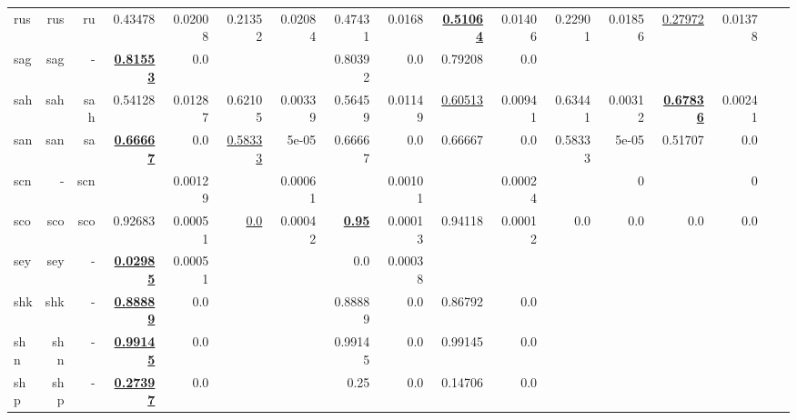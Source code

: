 \documentclass[11pt]{article}
\begin{document}
\begin{table*}[h]
{\begin{tabular}{lrrrrrrrrrrrrrrrr}
rus         & rus         & ru         & 0.43478         & 0.02008         & 0.21352         & 0.02084         & 0.47431         & 0.0168         & \textbf{\underline{0.51064}}         & 0.01406         & 0.22901         & 0.01856         & \underline{0.27972}         & 0.01378         \\
sag         & sag         & -         & \textbf{\underline{0.81553}}         & 0.0         &          &          & 0.80392         & 0.0         & 0.79208         & 0.0         &          &          &          &          \\
sah         & sah         & sah         & 0.54128         & 0.01287         & 0.62105         & 0.00339         & 0.56459         & 0.01149         & \underline{0.60513}         & 0.00941         & 0.63441         & 0.00312         & \textbf{\underline{0.67836}}         & 0.00241         \\
san         & san         & sa         & \textbf{\underline{0.66667}}         & 0.0         & \underline{0.58333}         & 5e-05         & 0.66667         & 0.0         & 0.66667         & 0.0         & 0.58333         & 5e-05         & 0.51707         & 0.0         \\
scn         & -         & scn         &          & 0.00129         &          & 0.00061         &          & 0.00101         &          & 0.00024         &          & 0         &          & 0         \\
sco         & sco         & sco         & 0.92683         & 0.00051         & \underline{0.0}         & 0.00042         & \textbf{\underline{0.95}}         & 0.00013         & 0.94118         & 0.00012         & 0.0         & 0.0         & 0.0         & 0.0         \\
sey         & sey         & -         & \textbf{\underline{0.02985}}         & 0.00051         &          &          & 0.0         & 0.00038         &          &          &          &          &          &          \\
shk         & shk         & -         & \textbf{\underline{0.88889}}         & 0.0         &          &          & 0.88889         & 0.0         & 0.86792         & 0.0         &          &          &          &          \\
shn         & shn         & -         & \textbf{\underline{0.99145}}         & 0.0         &          &          & 0.99145         & 0.0         & 0.99145         & 0.0         &          &          &          &          \\
shp         & shp         & -         & \textbf{\underline{0.27397}}         & 0.0         &          &          & 0.25         & 0.0         & 0.14706         & 0.0         &          &          &          &          \\

\end{tabular}}
\end{table*}
\end{document}
